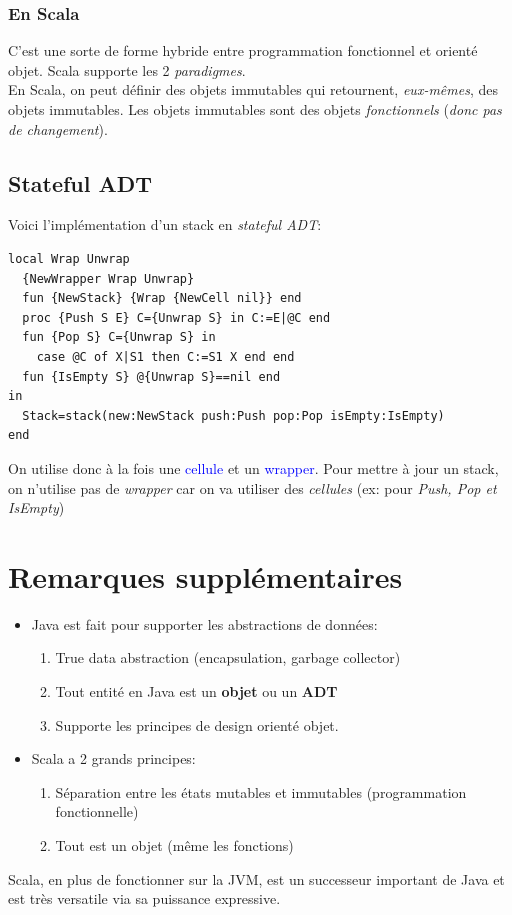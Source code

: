\documentclass{report}
\begin{document}
\subsubsection{En Scala}
C'est une sorte de forme hybride entre programmation fonctionnel et orienté objet. Scala supporte les 2 \textit{paradigmes}.\\
En Scala, on peut définir des objets immutables qui retournent, \textit{eux-mêmes}, des objets immutables.  Les objets immutables sont des objets \textit{fonctionnels} (\textit{donc pas de changement}).

\subsection{Stateful ADT}
Voici l'implémentation d'un stack en \textit{stateful ADT}:
\begin{lstlisting}[escapechar=\%]
local Wrap Unwrap 
  {NewWrapper Wrap Unwrap} 
  fun {NewStack} {Wrap {NewCell nil}} end 
  proc {Push S E} C={Unwrap S} in C:=E|@C end 
  fun {Pop S} C={Unwrap S} in 
    case @C of X|S1 then C:=S1 X end end 
  fun {IsEmpty S} @{Unwrap S}==nil end
in 
  Stack=stack(new:NewStack push:Push pop:Pop isEmpty:IsEmpty)
end
\end{lstlisting}
On utilise donc à la fois une \textcolor{blue}{cellule} et un \textcolor{blue}{wrapper}. Pour mettre à jour un stack, on n'utilise pas de \textit{wrapper} car on va utiliser des \textit{cellules} (ex: pour \textit{Push, Pop et IsEmpty})

\section{Remarques supplémentaires}
\begin{itemize}
\item Java est fait pour supporter les abstractions de données:
	\begin{enumerate}
	\item True data abstraction (encapsulation, garbage collector)
	\item Tout entité en Java est un \textbf{objet} ou un \textbf{ADT}
	\item Supporte les principes de design orienté objet.
	\end{enumerate}
\item Scala a 2 grands principes:
	\begin{enumerate}
	\item Séparation entre les états mutables et immutables (programmation fonctionnelle)
	\item Tout est un objet (même les fonctions)
	\end{enumerate}
\end{itemize}
Scala, en plus de fonctionner sur la JVM, est un successeur important de Java et est très versatile via sa puissance expressive.
\end{document}

